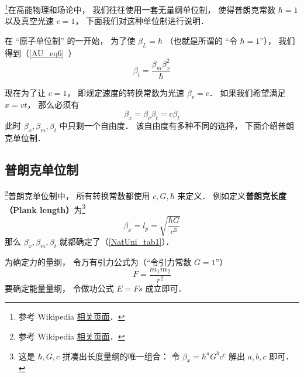 
\begin{issues}
\issueDraft
\end{issues}


\footnote{参考 Wikipedia \href{https://en.wikipedia.org/wiki/Natural_units}{相关页面}．}在高能物理和场论中， 我们往往使用一套无量纲单位制， 使得普朗克常数 $\hbar = 1$ 以及真空光速 $c = 1$， 下面我们对这种单位制进行说明．

在 “原子单位制” 的一开始， 为了使 $\beta_L = \hbar$ （也就是所谓的 “令 $\hbar = 1$”）， 我们得到（\autoref{AU_eq6}~）
\begin{equation}\label{NatUni_eq1}
\beta_t = \frac{\beta_m \beta_x^2}{\hbar}
\end{equation}

现在为了让 $c = 1$， 即规定速度的转换常数为光速 $\beta_v = c$． 如果我们希望满足 $x = vt$， 那么必须有
\begin{equation}
\beta_x = \beta_v \beta _t = c\beta_t
\end{equation}
此时 $\beta_x, \beta_m, \beta_t$ 中只剩一个自由度． 该自由度有多种不同的选择， 下面介绍普朗克单位制．

\subsection{普朗克单位制}
\footnote{参考 Wikipedia \href{https://en.wikipedia.org/wiki/Planck_units}{相关页面}．}普朗克单位制中， 所有转换常数都使用 $c, G, \hbar$ 来定义． 例如定义\textbf{普朗克长度（Plank length）}为\footnote{这是 $\hbar, G, c$ 拼凑出长度量纲的唯一组合： 令 $\beta_x = \hbar^a G^b c^c$ 解出 $a, b, c$ 即可．}
\begin{equation}
\beta_x = l_p = \sqrt{\frac{\hbar G}{c^3}}
\end{equation}
那么 $\beta_x, \beta_m, \beta_t$ 就都确定了（\autoref{NatUni_tab1}）．

为确定力的量纲， 令万有引力公式为（“令引力常数 $G = 1$”）
\begin{equation}
F = \frac{m_1 m_2}{r^2}
\end{equation}
要确定能量量纲， 令做功公式 $E = Fs$ 成立即可．

